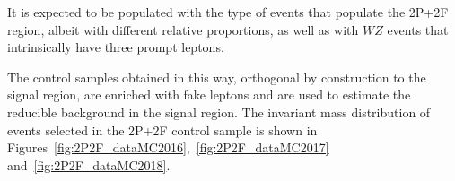 It is expected to be populated with the type of events that populate the
2P+2F region, albeit with different relative proportions,
as well as with $WZ$ events that intrinsically have three prompt leptons.

The control samples obtained in this way, orthogonal by construction
to the signal region, are enriched with fake leptons and are used to
estimate the reducible background in the signal region. 
The invariant mass distribution of events selected in the 2P+2F control sample
is shown in Figures~\ref{fig:2P2F_dataMC2016},~\ref{fig:2P2F_dataMC2017} and~\ref{fig:2P2F_dataMC2018}. 
\begin{figure}[!htb]
\begin{center}
          \\

\end{center}
\end{figure}
